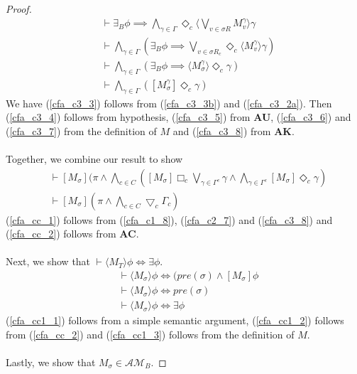 \documentclass[12pt, a4paper, titlepage]{article}
\numberwithin{equation}{section}
\newcommand{\cover}{\bigtriangledown}
\newcommand{\sqex}[1]{[{#1}]}
\newcommand{\anex}[1]{\langle {#1} \rangle}
\newcommand{\axAC}{{\bf AC}}
\newcommand{\axAK}{{\bf AK}}
\newcommand{\axAU}{{\bf AU}}
\newcommand{\eventClass}{\mathcal{AM}}
\begin{document}
\begin{proof}
\begin{align}
	& \vdash \exists_B \phi \implies \bigwedge_{\gamma \in \Gamma} \Diamond_c \anex{
	\bigvee_{v \in \sigma R} M^\gamma_{v} } \gamma\label{cfa_c3_5}\\
	& \vdash \bigwedge_{\gamma \in \Gamma} (\exists_B \phi \implies \bigvee_{v \in \sigma R_c}
	\Diamond_c \anex{ M^\gamma_{v} } \gamma)\label{cfa_c3_6}\\
	& \vdash \bigwedge_{\gamma \in \Gamma} (\exists_B \phi \implies \anex{ M^\gamma_{\sigma}
	} \Diamond_c \gamma)\label{cfa_c3_7}\\
	& \vdash \bigwedge_{\gamma \in \Gamma} ([M^\gamma_{\sigma}] \Diamond_c \gamma)\label{cfa_c3_8}
\end{align}
We have (\ref{cfa_c3_3}) follows from (\ref{cfa_c3_3b}) and (\ref{cfa_c3_2a}).
Then (\ref{cfa_c3_4}) follows from hypothesis, (\ref{cfa_c3_5}) from \axAU, (\ref{cfa_c3_6}) and
(\ref{cfa_c3_7}) from the definition of $M$ and (\ref{cfa_c3_8}) from \axAK.\\
\\
Together, we combine our result to show
\begin{align}
	& \vdash \sqex{M_\sigma} (\pi \land \bigwedge_{c \in C} \left( \sqex{M_\sigma} \Box_c \bigvee_{\gamma \in
		\Gamma^c} \gamma \land
	\bigwedge_{\gamma \in \Gamma^c} \sqex{M_\sigma} \Diamond_c \gamma \right) \label{cfa_cc_1} \\
	& \vdash \sqex{M_\sigma}(\pi \land \bigwedge_{c \in C} \cover_c \Gamma_c) \label{cfa_cc_2}
\end{align}
(\ref{cfa_cc_1}) follows from (\ref{cfa_c1_8}), (\ref{cfa_c2_7}) and (\ref{cfa_c3_8}) and
(\ref{cfa_cc_2}) follows from \axAC.\\
\\
Next, we show that $\vdash \anex{ M_T } \phi \iff \exists \phi$.
\begin{align}
	& \vdash \anex{ M_\sigma } \phi \iff (pre(\sigma) \land [ M_\sigma ] \phi \label{cfa_cc1_1}\\
	& \vdash \anex{ M_\sigma } \phi \iff pre(\sigma) \label{cfa_cc1_2}\\
	& \vdash \anex{ M_\sigma } \phi \iff \exists \phi\label{cfa_cc1_3}
\end{align}
(\ref{cfa_cc1_1}) follows from a simple semantic argument, (\ref{cfa_cc1_2}) follows from
(\ref{cfa_cc_2}) and (\ref{cfa_cc1_3}) follows from the definition of $M$.\\
\\
Lastly, we show that $M_\sigma \in \eventClass_B$.
\end{proof}
\end{document}
